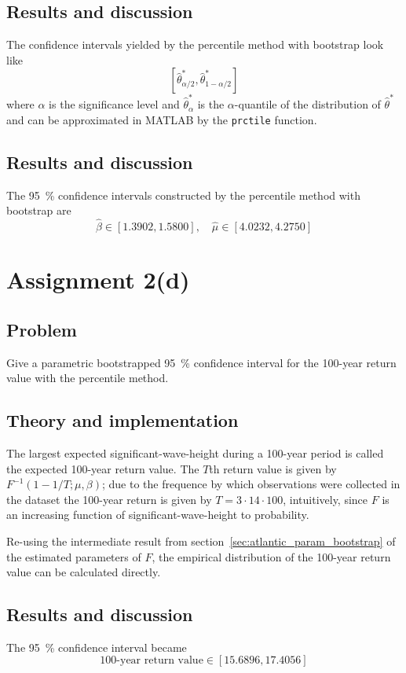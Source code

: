 \documentclass[11pt, a4paper]{article}
\begin{document}
\subsection{Results and discussion}
The confidence intervals yielded by the percentile method with bootstrap look like
$$ \left[\hat\theta^*_{\alpha/2}, \hat\theta^*_{1-\alpha/2}\right] $$
where $\alpha$ is the significance level and $\hat\theta^*_\alpha$ is the
$\alpha$-quantile of the distribution of $\hat\theta^*$
and can be approximated in MATLAB by the \texttt{prctile} function.
\subsection{Results and discussion}
The \SI{95}{\percent} confidence intervals constructed by the percentile method with bootstrap are
\begin{equation}\label{eq:atlantic_param_ci}
	\hat\beta \in [\num{1.3902}, \num{1.5800}], \quad \hat\mu \in [\num{4.0232}, \num{4.2750}]
\end{equation}

\section{Assignment 2(d)}\label{sec:return_value}
\subsection{Problem}
Give a parametric bootstrapped \SI{95}{\percent} confidence interval
for the 100-year return value with the percentile method.
\subsection{Theory and implementation}
The largest expected significant-wave-height during a 100-year period
is called the expected 100-year return value.
The $T$th return value is given by $F^{-1}(1 - 1 / T; \mu, \beta)$;
due to the frequence by which observations were collected in the dataset
the 100-year return is given by $T = 3 \cdot 14 \cdot 100$, intuitively,
since $F$ is an increasing function of significant-wave-height to probability.

Re-using the intermediate result from section~\ref{sec:atlantic_param_bootstrap}
of the estimated parameters of $F$,
the empirical distribution of the 100-year return value can be calculated directly.
\subsection{Results and discussion}
The \SI{95}{\percent} confidence interval became
$$ \text{100-year return value} \in [\num{15.6896}, \num{17.4056}] $$
\end{document}
